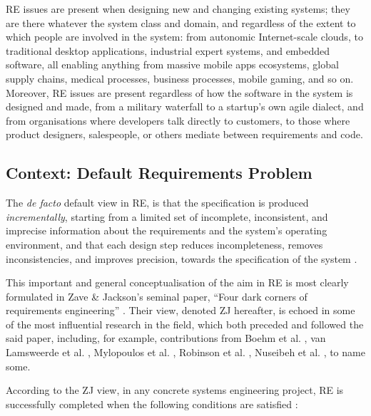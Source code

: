 \documentclass[graybox]{svmult}
\newcommand{\zi}[1]{\textit{#1}}
\newcommand{\RE}{RE}
\newcommand{\RPfull}{Requirements Problem}
\newcommand{\ZJ}{ZJ}
\newcommand{\ZJRPfull}{Default \RPfull}
\begin{document}
\RE{} issues are present when designing new and changing existing systems; they are there whatever the system class and domain, and regardless of the extent to which people are involved in the system: from autonomic Internet-scale clouds, to traditional desktop applications, industrial expert systems, and embedded software, all enabling anything from massive mobile apps ecosystems, global supply chains, medical processes, business processes, mobile gaming, and so on. Moreover, RE issues are present regardless of how the software in the system is designed and made, from a military waterfall to a startup's own agile dialect, and from organisations where developers talk directly to customers, to those where product designers, salespeople, or others mediate between requirements and code.


%
\subsection{Context: \ZJRPfull}\label{s:introduction:context}
The \zi{de facto} default view in \RE, is that the specification is produced \zi{incrementally}, starting from a limited set of incomplete, inconsistent, and imprecise information about the requirements and the system's operating environment, and that each design step reduces incompleteness, removes inconsistencies, and improves precision, towards the specification of the system \cite{boehm1988spiral, dardenne1993goal, greenspan1994formal, nuseibeh1994framework, finkelstein1994inconsistency, zave1997four, van2001goal, castro2002towards, robinson2003requirements, jureta2010techne, ernst2013agile}.

This important and general conceptualisation of the aim in \RE{} is most clearly formulated in Zave \& Jackson's seminal paper, ``Four dark corners of requirements engineering'' \cite{zave1997four}. Their view, denoted \ZJ{} hereafter, is echoed in some of the most influential research in the field, which both preceded and followed the said paper, including, for example, contributions from Boehm et al. \cite{boehm1988spiral,boehm1995software}, van Lamsweerde et al. \cite{dardenne1993goal, darimont1996formal, van1998managing, van2000handling, van2001goal, letier2004reasoning}, Mylopoulos et al. \cite{mylopoulos1992representing, greenspan1994formal, castro2002towards}, Robinson et al. \cite{robinson2003requirements}, Nuseibeh et al. \cite{nuseibeh1994framework, hunter1998managing}, to name some.

According to the \ZJ{} view, in any concrete systems engineering project, \RE{} is successfully completed when the following conditions are satisfied \cite{zave1997four}:
\end{document}
